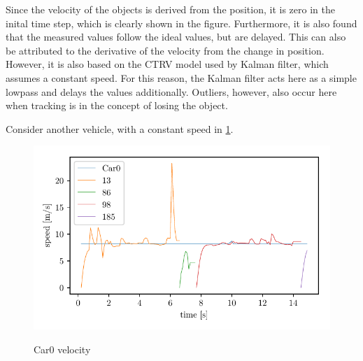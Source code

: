 \documentclass[11pt,oneside,openright]{mpreport}
\begin{document}

Since the velocity of the objects is derived from the position, it is zero in the inital time step, which is clearly shown in the figure. 
Furthermore, it is also found that the measured values follow the ideal values, but are delayed.
This can also be attributed to the derivative of the velocity from the change in position. However, it is also based on the \ac{CTRV} model used by Kalman filter, 
which assumes a constant speed. For this reason, the Kalman filter acts here as a simple lowpass and delays the values additionally. 
Outliers, however, also occur here when tracking is in the concept of losing the object.

Consider another vehicle, with a constant speed in \cref{car0_speed}.
\begin{figure}[!htb]
  \caption{Car0 velocity} 
  \centering
  \includegraphics[width=\textwidth]{bilder/Car0_speed.pdf}
 \label{car0_speed}
\end{figure}
\end{document}
